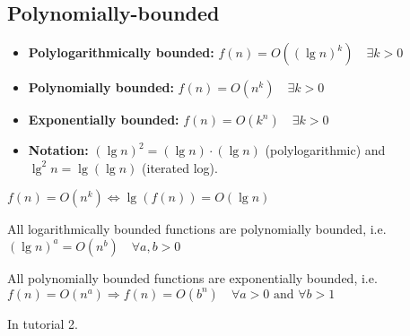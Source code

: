 \subsection{Polynomially-bounded}
\begin{definition}
    \begin{itemize}
        \item \textbf{Polylogarithmically bounded:} \( f(n) = O((\lg n)^k) \quad \exists k > 0 \)
        
        \item \textbf{Polynomially bounded:} \( f(n) = O(n^k) \quad \exists k > 0 \)
        
        \item \textbf{Exponentially bounded:} \( f(n) = O(k^n) \quad \exists k > 0 \)
    \end{itemize}
\end{definition}

\begin{intuition}
    \begin{itemize}
        \item \textbf{Notation:} \( (\lg n)^2 = (\lg n) \cdot (\lg n) \) (polylogarithmic) and \( \lg^2 n = \lg(\lg n) \) (iterated log). 
    \end{itemize}
\end{intuition}

\begin{theorem}
    $f(n) = O(n^k) \Leftrightarrow \lg(f(n)) = O(\lg n)$
\end{theorem}

\begin{theorem}
    All logarithmically bounded functions are polynomially bounded, i.e. \((\lg n)^a = O(n^b) \quad \forall a, b > 0\)
\end{theorem}

\begin{theorem}
    All polynomially bounded functions are exponentially bounded, i.e. \( f(n) = O(n^a) \Rightarrow f(n) = O(b^n) \quad \forall a > 0 \text{ and } \forall b > 1\)
\end{theorem}

\begin{derivation}
    In tutorial 2.
\end{derivation}

